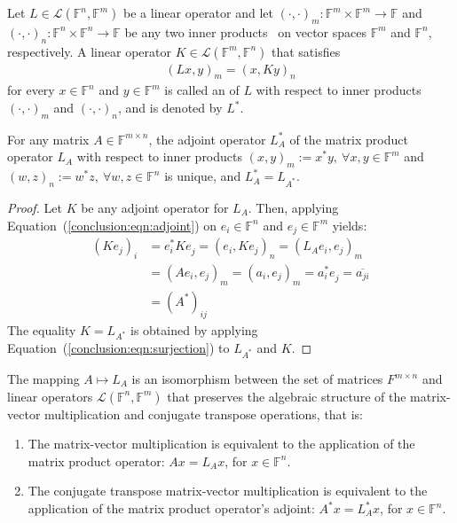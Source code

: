 \begin{definition}
Let $L \in \mathcal{L}(\mathbb{F}^n, \mathbb{F}^m)$ be a linear operator and
let $(\cdot, \cdot)_m : \mathbb{F}^m \times \mathbb{F}^m \rightarrow
\mathbb{F}$ and $(\cdot, \cdot)_n : \mathbb{F}^n \times \mathbb{F}^n
\rightarrow \mathbb{F}$ be any two inner products~\cite{la} on vector spaces
$\mathbb{F}^m$ and $\mathbb{F}^n$, respectively. A linear operator $K \in
\mathcal{L}(\mathbb{F}^m, \mathbb{F}^n)$ that satisfies
\begin{align}
    (Lx, y)_m = (x, Ky)_n \label{conclusion:eqn:adjoint}
\end{align}
for every $x \in \mathbb{F}^n$ and $y \in \mathbb{F}^m$ is called an
 of $L$ with respect to inner products $(\cdot,
\cdot)_m$ and $(\cdot, \cdot)_n$, and is denoted by $L^*$.
\end{definition}

\begin{theorem}
\label{conclusion:thm:adjoint}
For any matrix $A \in \mathbb{F}^{m \times n}$, the adjoint operator $L_A^*$ of
the matrix product operator $L_A$ with respect to inner products $(x, y)_m :=
x^*y, \ \forall x,y \in \mathbb{F}^m$ and $(w, z)_n := w^*z, \ \forall w, z \in
\mathbb{F}^n$ is unique, and $L_A^* = L_{A^*}^{}$.
\end{theorem}

\begin{proof}
Let $K$ be any adjoint operator for $L_A$. Then, applying
Equation~(\ref{conclusion:eqn:adjoint}) on $e_i \in \mathbb{F}^n$ and $e_j \in
\mathbb{F}^m$ yields:
\begin{align}
    (Ke_j)_i &= e_i^*Ke_j^{} = (e_i, Ke_j)_n = (L_Ae_i, e_j)_m \nonumber \\
             &= (Ae_i,  e_j)_m = (a_i, e_j)_m =a_i^*e_j^{} = \overline{a_{ji}}
             \\
             &= (A^*)_{ij} \nonumber
\end{align}
The equality $K = L_{A^*}$ is obtained by applying
Equation~(\ref{conclusion:eqn:surjection}) to $L_{A^*}$ and $K$.
\end{proof}

\begin{corollary}
\label{conclusion:cor:matrix-linop}
The mapping $A \mapsto L_A$ is an isomorphism between the set of
matrices $F^{m \times n}$ and linear operators $\mathcal{L}(\mathbb{F}^n,
\mathbb{F}^m)$ that preserves the algebraic structure of the matrix-vector
multiplication and conjugate transpose operations, that is:
\begin{enumerate}
\item The matrix-vector multiplication is equivalent to the application of the
matrix product operator: $Ax = L_Ax$, for $x \in \mathbb{F}^n$.
\item The conjugate transpose matrix-vector multiplication is equivalent to the
application of the matrix product operator's adjoint: $A^*x = L_A^*x$, for $x
\in \mathbb{F}^n$.
\end{enumerate}
\end{corollary}

